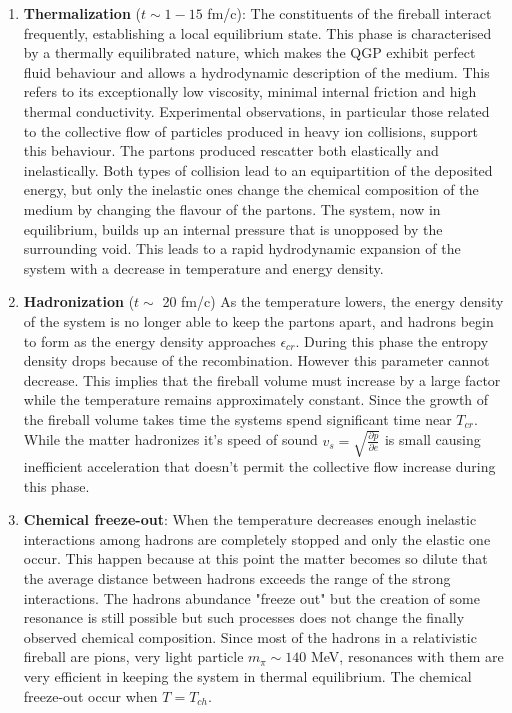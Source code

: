 \documentclass[12pt,a4paper]{book}
\begin{document}
\begin{enumerate}
		\item  \textbf{Thermalization} ($t \sim 1 - 15$ fm/c): The constituents of the fireball interact frequently, establishing a local equilibrium state. This phase is characterised by a thermally equilibrated nature, which makes the QGP exhibit perfect fluid behaviour and allows a hydrodynamic description of the medium.  This refers to its exceptionally low viscosity, minimal internal friction and high thermal conductivity. Experimental observations, in particular those related to the collective flow of particles produced in heavy ion collisions, support this behaviour. The partons produced rescatter both elastically and inelastically. Both types of collision lead to an equipartition of the deposited energy, but only the inelastic ones change the chemical composition of the medium by changing the flavour of the partons. The system, now in equilibrium, builds up an internal pressure that is unopposed by the surrounding void. This leads to a rapid hydrodynamic expansion of the system with a decrease in temperature and energy density.
		
		\item \textbf{Hadronization} ($t \sim$ 20 fm/c) As the temperature lowers, the energy density of the system is no longer able to keep the partons apart, and hadrons begin to form as the energy density approaches $\epsilon_{cr}$. During this phase the entropy density drops because of the recombination. However this parameter cannot decrease. This implies that the fireball volume must increase by a large factor while the temperature remains approximately constant. Since the growth of the fireball volume takes time the systems spend significant time near $T_{cr}$. While the matter hadronizes it's speed of sound $v_s=\sqrt{\frac{\partial p}{\partial e}}$ is small causing inefficient acceleration that doesn't permit the collective flow increase during this phase.
		
		\item \textbf{Chemical freeze-out}: When the temperature decreases enough inelastic interactions among hadrons are completely stopped and only the elastic one occur. This happen because at this point the matter becomes so dilute that the average distance between hadrons exceeds the range of the strong interactions. The hadrons abundance "freeze out" but the creation of some resonance is still possible but such processes does not change the finally observed chemical composition. Since most of the hadrons in a relativistic fireball are pions, very light particle $m_\pi \sim 140$ MeV, resonances with them are very efficient in keeping the system in thermal equilibrium. The chemical freeze-out occur when $T= T_{ch}$.
		

\end{enumerate}
\end{document}
